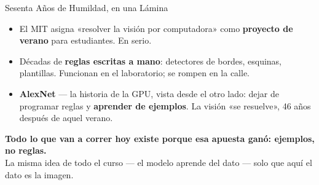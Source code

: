 \documentclass[aspectratio=169, 11pt]{beamer}
\begin{document}
\begin{frame}[shrink=5]{Sesenta Años de Humildad, en una Lámina}
  \vspace{2pt}
  {\footnotesize\color{textMuted}
  \begin{itemize}\setlength{\itemsep}{4pt}
    \item[{\color{arcaRed}\bfseries 1966}]
      El MIT asigna «resolver la visión por computadora» como
      \textbf{proyecto de verano} para estudiantes. En serio.
    \item[{\color{arcaRed}\bfseries 1970--2010}]
      Décadas de \textbf{reglas escritas a mano}: detectores de bordes,
      esquinas, plantillas. Funcionan en el laboratorio; se rompen en la
      calle.
    \item[{\color{arcaRed}\bfseries 2012}]
      \textbf{AlexNet} --- la historia de la GPU, vista desde el otro lado:
      dejar de programar reglas y \textbf{aprender de ejemplos}. La visión
      «se resuelve», 46 años después de aquel verano.
  \end{itemize}}
  \vspace{5pt}
  \begin{tcolorbox}[colback=arcaGray, colframe=arcaRed, boxrule=0pt,
    leftrule=4pt, arc=3pt, left=10pt, right=10pt, top=5pt, bottom=5pt]
    {\footnotesize\color{arcaDark}\bfseries
     Todo lo que van a correr hoy existe porque esa apuesta ganó: ejemplos,
     no reglas.}\\[2pt]
    {\scriptsize\color{textMuted}
     La misma idea de todo el curso --- el modelo aprende del dato --- solo
     que aquí el dato es la imagen.}
  \end{tcolorbox}
\end{frame}
\end{document}
